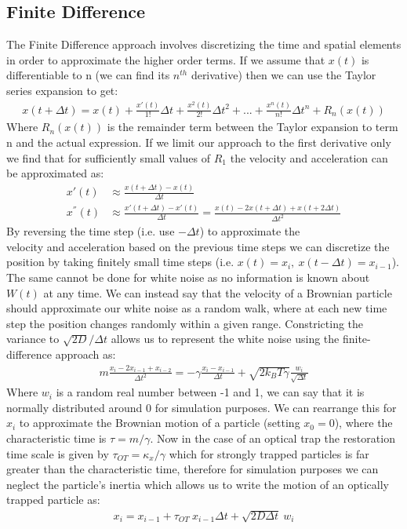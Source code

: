 \subsection{Finite Difference}
The Finite Difference approach involves discretizing the time and spatial 
elements in order to approximate the higher order terms. If we assume that 
$x(t)$ is differentiable to n (we can find its $n^{th}$ derivative) then 
we can use the Taylor series expansion to get:
\begin{align}
	x(t+\Delta t) = x(t)+\frac{x'(t)}{1!}\Delta t + \frac{x^2(t)}{2!}\Delta t^2+...+\frac{x^n(t)}{n!}\Delta t^n+R_n(x(t))	
\end{align}
Where $R_n(x(t))$ is the remainder term between the Taylor expansion to 
term n and the actual expression. If we limit our approach to the first 
derivative only we find that for sufficiently small values of $R_1$ the 
velocity and acceleration can be approximated as:
\begin{align}
	x'(t) &\approx \frac{x(t+\Delta t)-x(t)}{\Delta t}
	\\
	x^{''}(t) &\approx \frac{x'(t+\Delta t)-x'(t)}{\Delta t} = \frac{x(t)-2x(t+\Delta t)+x(t+2\Delta t)}{\Delta t^2}
\end{align}
By reversing the time step (i.e. use $-\Delta t$) to approximate the \\
velocity and acceleration based on the previous time steps we can 
discretize the position by taking finitely small  time steps (i.e. 
$x(t) = x_i,\ x(t-\Delta t) = x_{i-1}$). The same cannot be done for 
white noise as no information is known about $W(t)$ at any time. We 
can instead say that the velocity of a Brownian particle should 
approximate our white noise as a random walk, where at each new time 
step the position changes randomly within a given range. Constricting 
the variance to $\sqrt{2D}/\Delta t$ allows us to represent the white 
noise using the finite-difference approach as:
\begin{align}
	m\frac{x_i-2x_{i-1}+x_{i-2}}{\Delta t^2} = -\gamma\frac{x_i-x_{i-1}}{\Delta t}+\sqrt{2k_BT\gamma}\frac{w_i}{\sqrt{\Delta t}}
\end{align}
Where $w_i$ is a random real number between -1 and 1, we can say that 
it is normally distributed around 0 for simulation purposes. We can 
rearrange this for $x_i$ to approximate the Brownian motion of a 
particle (setting $x_0=0$), where the characteristic time is $\tau = m/\gamma$. 
Now in the case of an optical trap the restoration time scale is 
given by $\tau_{OT}=\kappa_x/\gamma$ which for strongly trapped particles 
is far greater than the characteristic time, therefore for simulation 
purposes we can neglect the particle's inertia which allows us to 
write the motion of an optically trapped particle as:
\begin{align}
	\label{eq:sim_langevin}
	x_i = x_{i-1} + \tau_{OT}\ x_{i-1}\Delta t + \sqrt{2D\Delta t}\ w_i
\end{align} 

